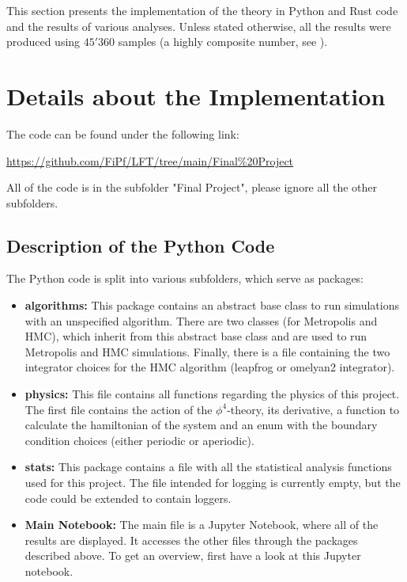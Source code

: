 This section presents the implementation of the theory in Python and Rust code and the results of various analyses. Unless stated otherwise, all the results were produced using $45'360$ samples (a highly composite number, see \cite{wikipedia_highly_composite_number}).
\section{Details about the Implementation}\label{sec: implementations}
The code can be found under the following link:
\begin{center}
    \url{https://github.com/FiPf/LFT/tree/main/Final%20Project}
\end{center}
All of the code is in the subfolder "Final Project", please ignore all the other subfolders.
\subsection{Description of the Python Code}
The Python code is split into various subfolders, which serve as packages: 
\begin{itemize}
    \item \textbf{algorithms:} This package contains an abstract base class to run simulations with an unspecified algorithm. There are two classes (for Metropolis and HMC), which inherit from this abstract base class and are used to run Metropolis and HMC simulations. Finally, there is a file containing the two integrator choices for the HMC algorithm (leapfrog or omelyan2 integrator). 
    \item \textbf{physics:} This file contains all functions regarding the physics of this project. The first file contains the action of the $\phi^4$-theory, its derivative, a function to calculate the hamiltonian of the system and an enum with the boundary condition choices (either periodic or aperiodic).
    \item \textbf{stats:} This package contains a file with all the statistical analysis functions used for this project. The file intended for logging is currently empty, but the code could be extended to contain loggers. 
    \item \textbf{Main Notebook: }The main file is a Jupyter Notebook, where all of the results are displayed. It accesses the other files through the packages described above. To get an overview, first have a look at this Jupyter notebook.
\end{itemize}
